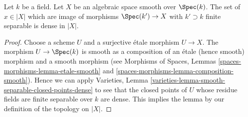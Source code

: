 \begin{lemma}
\label{lemma-smooth-separable-closed-points-dense}
Let $k$ be a field. Let $X$ be an algebraic space smooth over $\Spec(k)$.
The set of $x \in |X|$ which are image of morphisms $\Spec(k') \to X$
with $k' \supset k$ finite separable is dense in $|X|$.
\end{lemma}

\begin{proof}
Choose a scheme $U$ and a surjective \'etale morphism $U \to X$.
The morphism $U \to \Spec(k)$ is smooth as a composition of
an \'etale (hence smooth) morphism and a smooth morphism (see
Morphisms of Spaces, Lemmas \ref{spaces-morphisms-lemma-etale-smooth}
and \ref{spaces-morphisms-lemma-composition-smooth}).
Hence we can apply Varieties, Lemma
\ref{varieties-lemma-smooth-separable-closed-points-dense} to see that
the closed points of $U$ whose residue fields are finite separable over
$k$ are dense. This implies the lemma by our definition of the
topology on $|X|$.
\end{proof}














